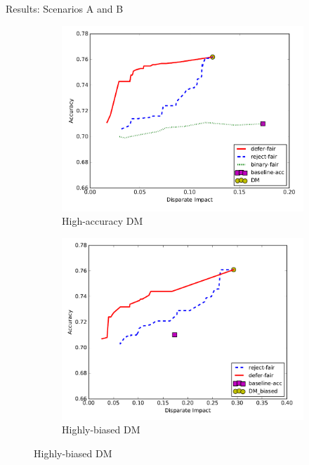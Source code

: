 \documentclass[11pt]{beamer}
\begin{document}
\begin{frame}{Results: Scenarios A and B}
\begin{figure}[t!]
\centering
\begin{subfigure}[t]{0.5\textwidth}
\includegraphics[width=\textwidth]{Figures/compasHighAcc.PNG}
\caption{High-accuracy DM}
\end{subfigure}%
\begin{subfigure}[t]{0.5\textwidth}
\includegraphics[width=\textwidth]{Figures/compasHighlyBiased.PNG}
\caption{Highly-biased DM}
\end{subfigure}
\end{figure}
\end{frame}
\end{document}
